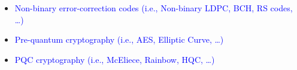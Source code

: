 \begin{itemize}
    \item \textcolor{blue}{Non-binary error-correction codes (i.e., Non-binary LDPC, BCH, RS codes, \dots)}
    \item \textcolor{blue}{Pre-quantum cryptography (i.e., AES, Elliptic Curve, \dots)}
    \item \textcolor{blue}{PQC cryptography (i.e., McEliece, Rainbow, HQC, \dots)}
\end{itemize}


